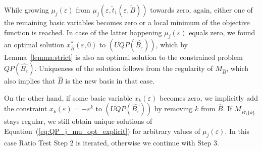 \documentclass[a4paper]{article}
\begin{document}
While growing $\mu_{j}(\varepsilon)$ from
$\mu_{j}(\varepsilon,\check{t}_{1}(\varepsilon, \tilde{B})
)$
towards zero,
again, either one of the remaining basic variables becomes zero or a local
minimum of the objective function is reached. In case of the latter happening
$\mu_{j}(\varepsilon)$ equals zero, we found an optimal solution
$x_{\hat{B}}^{*}\left(\varepsilon, 0\right)$ to $(UQP(\hat{B_{\varepsilon}}))$,
which by
Lemma~\ref{lemma:strict} is also an optimal solution to the constrained
problem
$QP(\hat{B_{\varepsilon}})$. Uniqueness of the solution follows from the
regularity of $M_{\hat{B}}$, which also implies that $\hat{B}$ is the new basis
in that case.

On the other hand, if some basic variable $x_{k}(\varepsilon)$ becomes zero, we
implicitly add the constraint $x_{k}(\varepsilon)=-\varepsilon^{k}$ to
$(UQP(\hat{B_{\varepsilon}}))$ by removing $k$ from $\hat{B}$. If
$M_{\hat{B} \setminus \{k\}}$ stays regular, we still obtain unique solutions
of Equation~(\ref{eq:QP_j_mu_opt_explicit}) for arbitrary values of
$\mu_{j}(\varepsilon)$. In this case Ratio Test Step 2 is iterated,
otherwise we continue with Step 3. 
 
\end{document}
